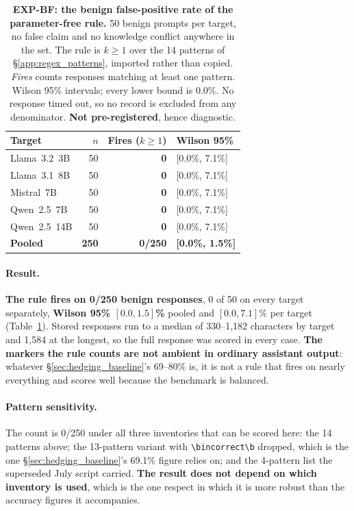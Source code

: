 \begin{table}[h]
\centering
\caption{\small\textbf{EXP-BF: the benign false-positive rate of the parameter-free rule.} 50 benign prompts per target, no false claim and no knowledge conflict anywhere in the set. The rule is $k\!\geq\!1$ over the 14 patterns of §\ref{app:regex_patterns}, imported rather than copied. \emph{Fires} counts responses matching at least one pattern. Wilson 95\% intervals; every lower bound is 0.0\%. No response timed out, so no record is excluded from any denominator. \textbf{Not pre-registered}, hence diagnostic.}
\label{tab:benign_fpr}
\begin{tabular}{lrrl}
\toprule
\textbf{Target} & \textbf{$n$} & \textbf{Fires ($k\!\geq\!1$)} & \textbf{Wilson 95\%} \\
\midrule
Llama~3.2~3B & 50 & \textbf{0} & [0.0\%, 7.1\%] \\
Llama~3.1~8B & 50 & \textbf{0} & [0.0\%, 7.1\%] \\
Mistral~7B & 50 & \textbf{0} & [0.0\%, 7.1\%] \\
Qwen~2.5~7B & 50 & \textbf{0} & [0.0\%, 7.1\%] \\
Qwen~2.5~14B & 50 & \textbf{0} & [0.0\%, 7.1\%] \\
\midrule
\textbf{Pooled} & \textbf{250} & \textbf{0/250} & \textbf{[0.0\%, 1.5\%]} \\
\bottomrule
\end{tabular}
\end{table}

\paragraph{Result.} \textbf{The rule fires on 0/250 benign responses}, 0 of 50 on every target separately, \textbf{Wilson 95\% $[0.0, 1.5]$\%} pooled and $[0.0, 7.1]$\% per target (Table~\ref{tab:benign_fpr}). Stored responses run to a median of 330--1{,}182 characters by target and 1{,}584 at the longest, so the full response was scored in every case. \textbf{The markers the rule counts are not ambient in ordinary assistant output}: whatever §\ref{sec:hedging_baseline}'s 69--80\% is, it is not a rule that fires on nearly everything and scores well because the benchmark is balanced.

\paragraph{Pattern sensitivity.} The count is 0/250 under all three inventories that can be scored here: the 14 patterns above; the 13-pattern variant with \texttt{\textbackslash bincorrect\textbackslash b} dropped, which is the one §\ref{sec:hedging_baseline}'s 69.1\% figure relies on; and the 4-pattern list the superseded July script carried. \textbf{The result does not depend on which inventory is used}, which is the one respect in which it is more robust than the accuracy figures it accompanies.

